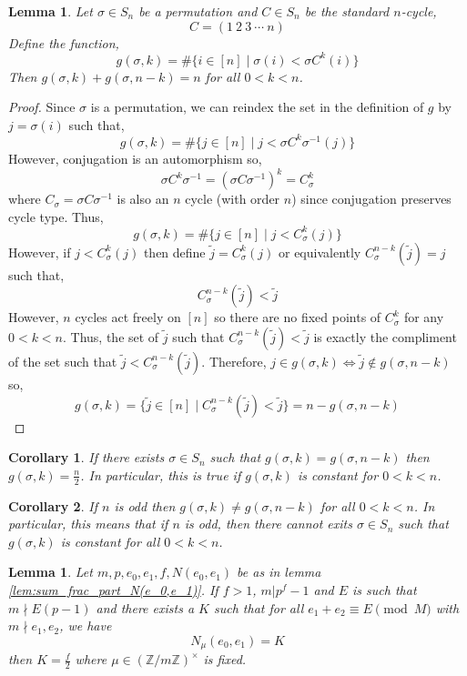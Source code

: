 \documentclass{article}
\newcommand{\Z}{\mathbb{Z}}
\newtheorem{corollary}{Corollary}[theorem]
\newtheorem{lemma}[theorem]{Lemma}
\theoremstyle{definition}
\theoremstyle{definition}
\theoremstyle{remark}
\begin{document}
\begin{lemma}
\label{lem:symmetric_group_order}
Let $\sigma \in S_n$ be a permutation and $C \in S_n$ be the standard $n$-cycle,
\[ C = (1 \: 2 \: 3 \: \cdots \: n) \]
Define the function,
\[ g(\sigma, k) = \# \{ i \in [n] \mid \sigma(i) < \sigma C^k (i) \} \]
Then $g(\sigma, k) + g(\sigma, n-k) = n$ for all $0 < k < n$.
\end{lemma}

\begin{proof}
Since $\sigma$ is a permutation, we can reindex the set in the definition of $g$ by $j = \sigma(i)$ such that,
\[ g(\sigma, k) = \# \{ j \in [n] \mid j < \sigma C^k \sigma^{-1}(j) \} \]
However, conjugation is an automorphism so,
\[ \sigma C^k \sigma^{-1} = (\sigma C \sigma^{-1})^k = C_{\sigma}^k \]
where $C_\sigma = \sigma C \sigma^{-1}$ is also an $n$ cycle (with order $n$) since conjugation preserves cycle type. Thus,
\[ g(\sigma, k) = \# \{ j \in [n] \mid j < C_\sigma^k (j) \} \]
However, if $j < C_\sigma^k (j)$ then define $\tilde{j} = C_\sigma^k (j)$ or equivalently $C_\sigma^{n - k}(\tilde{j}) = j$ such that,
\[ C_\sigma^{n - k}(\tilde{j}) < \tilde{j} \]
However, $n$ cycles act freely on $[n]$ so there are no fixed points of $C_\sigma^k$ for any $0 < k < n$. Thus, the set of $\tilde{j}$ such that $C_{\sigma}^{n-k}(\tilde{j}) < \tilde{j}$ is exactly the compliment of the set such that $\tilde{j} < C_{\sigma}^{n-k}(\tilde{j})$. Therefore, $j \in g(\sigma, k) \iff \tilde{j} \notin g(\sigma, n-k)$ so,
\[ g(\sigma, k) = \{ \tilde{j} \in [n] \mid C_\sigma^{n - k}(\tilde{j}) < \tilde{j} \} = n - g(\sigma, n - k) \]
\end{proof}

\begin{corollary}
If there exists $\sigma \in S_n$ such that $g(\sigma, k) = g(\sigma, n-k)$ then $g(\sigma, k) = \frac{n}{2}$. In particular, this is true if $g(\sigma, k)$ is constant for $0 < k < n$.
\end{corollary}

\begin{corollary}
If $n$ is odd then $g(\sigma, k) \neq g(\sigma, n - k)$ for all $0 < k < n$. In particular, this means that if $n$ is odd, then there cannot exits $\sigma \in S_n$ such that $g(\sigma, k)$ is constant for all $0 < k < n$. 
\end{corollary}


\begin{lemma} \label{lem:N(e_0,e_1)_constant} Let $m,p,e_0,e_1,f,N(e_0,e_1)$ be as in lemma \ref{lem:sum_frac_part_N(e_0,e_1)}. If $f > 1$, $m | p^{f} - 1$ and $E$ is such that $m \nmid E(p-1)$ and there exists a $K$ such that for all $e_1 + e_2 \equiv E \pmod{M}$ with $m \nmid e_1, e_2$, we have
\[N_\mu(e_0, e_1) = K\]
then $K = \frac{f}{2}$ where $\mu \in (\Z / m \Z)^\times$ is fixed.
\end{lemma}
\end{document}
